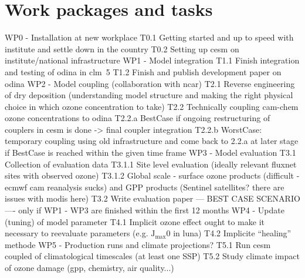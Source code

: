 \section*{Work packages and tasks}

WP0 - Installation at new workplace
T0.1 Getting started and up to speed with institute and settle down in the country
T0.2 Setting up \gls{cesm} on institute/national infrastructure
WP1 - Model integration
T1.1 Finish integration and testing of \gls{odina} in \gls{clm}~5
T1.2 Finish and publish development paper on \gls{odina}
WP2 - Model coupling (collaboration with \gls{ncar})
T2.1 Reverse engineering of dry deposition (understanding model structure and making the right physical choice in which ozone concentration to take)
T2.2 Technically coupling \gls{cam}-chem ozone concentrations to \gls{odina}
T2.2.a BestCase if ongoing restructuring of couplers in \gls{cesm} is done -> final coupler integration
T2.2.b WorstCase: temporary coupling using old infrastructure and come back to 2.2.a at later stage if BestCase is reached within the given time frame
WP3 - Model evaluation
T3.1 Collection of evaluation data 
T3.1.1 Site level evaluation (ideally relevant fluxnet sites with observed ozone)
T3.1.2 Global scale - surface ozone products (difficult - \gls{ecmwf} \gls{cam} reanalysis sucks) and GPP products (Sentinel satellites? there are issues with \gls{modis} here)
T3.2 Write evaluation paper
--- BEST CASE SCENARIO----
only if WP1 - WP3 are finished within the first 12 months
WP4 - Update (tuning) of model parameter
T4.1 Implicit ozone effect ought to make it necessary to reevaluate parameters (e.g. $\mathrm{J_{max}}$0 in \gls{luna})
T4.2 Implicite “healing” methode
WP5 - Production runs and climate projections?
T5.1 Run \gls{cesm} coupled of climatological timescales (at least one SSP)
T5.2 Study climate impact of ozone damage (gpp, chemistry, air quality...)


